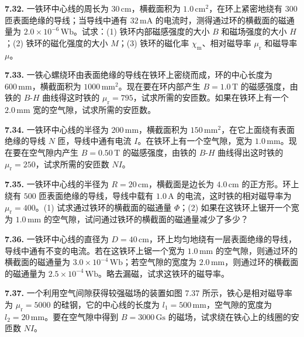 \vfill
\newpage

\textbf{7.32.} 一铁环中心线的周长为 $30\,\mathrm{cm}$，横截面积为 $1.0\,\mathrm{cm}^2$，在环上紧密地绕有 $300$ 匝表面绝缘的导线；当导线中通有 $32\,\mathrm{mA}$ 的电流时，测得通过环的横截面的磁通量为 $2.0 \times 10^{-6}\,\mathrm{Wb}$。试求：(1) 铁环内部磁感强度的大小 $B$ 和磁场强度的大小 $H$；(2) 铁环的磁化强度的大小 $M$；(3) 铁环的磁化率 $\chi_{\mathrm{m}}$、相对磁导率 $\mu_{\mathrm{r}}$ 和磁导率 $\mu$。

\vfill
\newpage

\textbf{7.33.} 一铁心螺绕环由表面绝缘的导线在铁环上密绕而成，环的中心长度为 $600\,\mathrm{mm}$，横截面积为 $1000\,\mathrm{mm}^2$。现在要在环内部产生 $B = 1.0\,\mathrm{T}$ 的磁感强度，由铁的 $B\text{-}H$ 曲线得这时铁的 $\mu_{\mathrm{r}} = 795$，试求所需的安匝数。如果在铁环上有一个 $2.0\,\mathrm{mm}$ 宽的空气隙，试求所需的安匝数。

\vfill
\newpage

\textbf{7.34.} 一铁环中心线的半径为 $200\,\mathrm{mm}$，横截面积为 $150\,\mathrm{mm}^2$，在它上面绕有表面绝缘的导线 $N$ 匝，导线中通有电流 $I$。在铁环上有一个空气隙，宽为 $1.0\,\mathrm{mm}$。现在要在空气隙内产生 $B = 0.50\,\mathrm{T}$ 的磁感强度，由铁的 $B\text{-}H$ 曲线得出这时铁的 $\mu_{\mathrm{r}} = 250$，试求所需的安匝数 $NI$。

\vfill
\newpage

\textbf{7.35.} 一铁环中心线的半径为 $R = 20\,\mathrm{cm}$，横截面是边长为 $4.0\,\mathrm{cm}$ 的正方形。环上绕有 $500$ 匝表面绝缘的导线，导线中载有 $1.0\,\mathrm{A}$ 的电流，这时铁的相对磁导率为 $\mu_{\mathrm{r}} = 400$。(1) 试求通过铁环的横截面的磁通量 $\Phi$；(2) 如果在这铁环上锯开一个宽为 $1.0\,\mathrm{mm}$ 的空气隙，试问通过铁环的横截面的磁通量减少了多少？

\vfill
\newpage

\textbf{7.36.} 一铁环中心线的直径为 $D = 40\,\mathrm{cm}$，环上均匀地绕有一层表面绝缘的导线，导线中通有不变的电流。若在这铁环上锯一个宽为 $1.0\,\mathrm{mm}$ 的空气隙，则通过环的横截面的磁通量为 $3.0 \times 10^{-4}\,\mathrm{Wb}$；若空气隙的宽度为 $2.0\,\mathrm{mm}$，则通过环的横截面的磁通量为 $2.5 \times 10^{-4}\,\mathrm{Wb}$。略去漏磁，试求这铁环的磁导率。

\vfill
\newpage

\textbf{7.37.} 一个利用空气间隙获得较强磁场的装置如图 7.37 所示，铁心是相对磁导率为 $\mu_{\mathrm{r}} = 5000$ 的硅钢，它的中心线的长度为 $l_1 = 500\,\mathrm{mm}$，空气隙的宽度为 $l_2 = 20\,\mathrm{mm}$。要在空气隙中得到 $B = 3000\,\mathrm{Gs}$ 的磁场，试求绕在铁心上的线圈的安匝数 $NI$。


